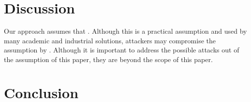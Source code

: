 \section{Discussion}
Our approach assumes that \blank{}. Although this is a practical assumption and used by many academic and industrial solutions, attackers may compromise the assumption by \blank. Although it is important to address the possible attacks out of the assumption of this paper, they are beyond the scope of this paper.
\section{Conclusion}